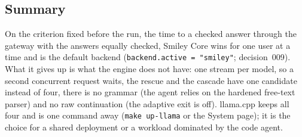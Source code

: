 \subsection{Summary}

On the criterion fixed before the run, the time to a checked answer through the gateway with the answers equally
checked, Smiley Core wins for one user at a time and is the default backend (\texttt{backend.active = "smiley"}; decision~009).
What it gives up is what the engine does not have: one stream per model, so a second concurrent request waits, the rescue
and the cascade have one candidate instead of four, there is no grammar (the agent relies on the hardened free-text parser) and
no raw continuation (the adaptive exit is off). llama.cpp keeps all four and is one command away (\texttt{make up-llama} or the
System page); it is the choice for a shared deployment or a workload dominated by the code agent.
